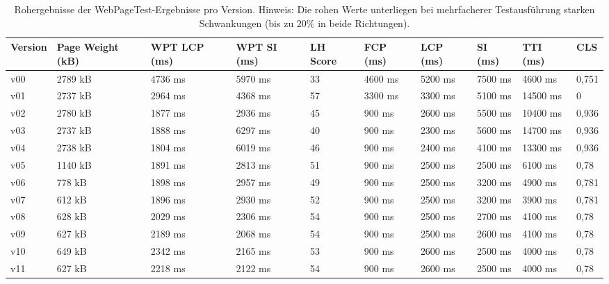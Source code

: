 \documentclass[11pt,a4paper]{article}
\begin{document}
\begin{landscape}
\begin{table}[h]
  \begin{tabular}{|l|l|l|l|l|l|l|l|l|l|}
    \hline
    Version & Page Weight (kB) & WPT LCP (ms) & WPT SI (ms) & LH Score & FCP (ms) & LCP (ms) & SI (ms) & TTI (ms) & CLS \\
    \hline
    v00 & 2789 kB & 4736 ms & 5970 ms & 33 & 4600 ms & 5200 ms & 7500 ms & 4600 ms & 0,751 \\
    \hline
    v01 & 2737 kB & 2964 ms & 4368 ms & 57 & 3300 ms & 3300 ms & 5100 ms & 14500 ms & 0 \\
    \hline
    v02 & 2780 kB & 1877 ms & 2936 ms & 45 & 900 ms & 2600 ms & 5500 ms & 10400 ms & 0,936 \\
    \hline
    v03 & 2737 kB & 1888 ms & 6297 ms & 40 & 900 ms & 2300 ms & 5600 ms & 14700 ms & 0,936 \\
    \hline
    v04 & 2738 kB & 1804 ms & 6019 ms & 46 & 900 ms & 2400 ms & 4100 ms & 13300 ms & 0,936 \\
    \hline
    v05 & 1140 kB & 1891 ms & 2813 ms & 51 & 900 ms & 2500 ms & 2500 ms & 6100 ms & 0,78 \\
    \hline
    v06 & 778 kB & 1898 ms & 2957 ms & 49 & 900 ms & 2500 ms & 3200 ms & 4900 ms & 0,781 \\
    \hline
    v07 & 612 kB & 1896 ms & 2930 ms & 52 & 900 ms & 2500 ms & 3200 ms & 3900 ms & 0,781 \\
    \hline
    v08 & 628 kB & 2029 ms & 2306 ms & 54 & 900 ms & 2500 ms & 2700 ms & 4100 ms & 0,78 \\
    \hline
    v09 & 627 kB & 2189 ms & 2068 ms & 54 & 900 ms & 2500 ms & 2600 ms & 4100 ms & 0,78 \\
    \hline
    v10 & 649 kB & 2342 ms & 2165 ms & 53 & 900 ms & 2600 ms & 2500 ms & 4000 ms & 0,78 \\
    \hline
    v11 & 627 kB & 2218 ms & 2122 ms & 54 & 900 ms & 2600 ms & 2500 ms & 4000 ms & 0,78 \\
    \hline
  \end{tabular}
  \caption{Rohergebnisse der WebPageTest-Ergebnisse pro Version. Hinweis: Die rohen Werte unterliegen bei mehrfacherer Testausführung starken Schwankungen (bis zu 20\% in beide Richtungen).}\label{tab:versionen}
\end{table}


\end{landscape}
\end{document}
